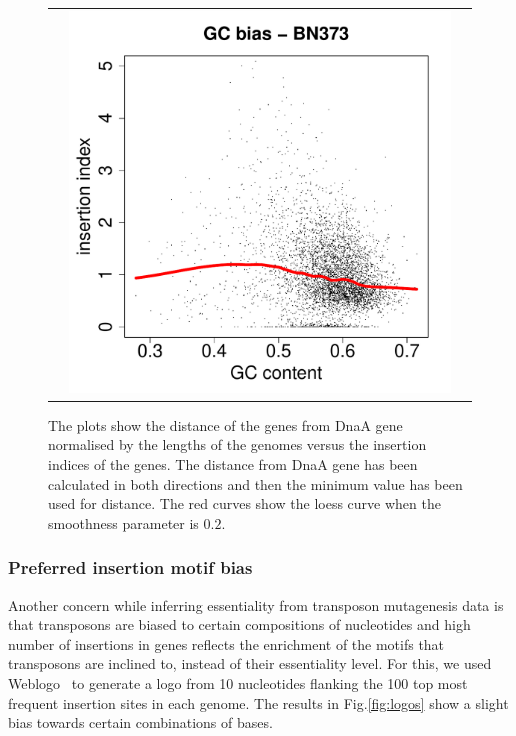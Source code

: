 \documentclass[12pt,letterpaper]{article}
\begin{document}
\begin{figure}
\begin{tabular}{c c c}
&\includegraphics[page=38, scale=0.25]{biases.pdf}&\\
\end{tabular}
\caption{The plots show the distance of the genes from DnaA gene normalised by the lengths of the genomes versus the insertion indices of the genes. The distance from DnaA gene has been calculated in both directions and then the minimum value has been used for distance. The red curves show the loess curve when the smoothness parameter is $0.2$.}
\label{fig:distance-bias}
\end{figure}

\subsubsection{Preferred insertion motif bias}
Another concern while inferring essentiality from transposon mutagenesis data is that transposons are biased to certain compositions of nucleotides and high number of insertions in genes reflects the enrichment of the motifs that transposons are inclined to, instead of their essentiality level. For this, we used Weblogo~\cite{crooks_weblogo:_2004} to generate a logo from 10 nucleotides flanking the 100 top most frequent insertion sites in each genome. The results in Fig.\@  \ref{fig:logos} show a slight bias towards certain combinations of bases.
\end{document}
